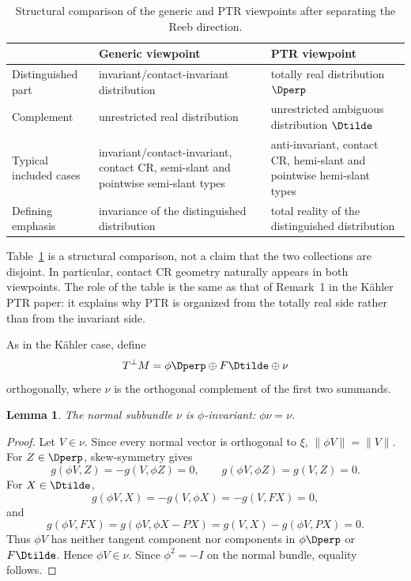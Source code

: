 \documentclass[11pt]{article}
\newtheorem{lemma}[theorem]{Lemma}\newtheorem{corollary}[theorem]{Corollary}
\theoremstyle{definition}\newtheorem{definition}[theorem]{Definition}\newtheorem{example}[theorem]{Example}
\theoremstyle{remark}\newtheorem{remark}[theorem]{Remark}
\newcommand{\Tperp}{T^{\perp}M}
\begin{document}
\begin{table}[ht]
\centering
\small
\caption{Structural comparison of the generic and PTR viewpoints after
separating the Reeb direction.}
\label{tab:generic-ptr}
\begin{tabular}{@{}>{\raggedright\arraybackslash}p{}>{\raggedright\arraybackslash}p{}>{\raggedright\arraybackslash}p{}@{}}
\toprule
 & Generic viewpoint & PTR viewpoint\\
\midrule
Distinguished part
& invariant/contact-invariant distribution
& totally real distribution \(\Dperp\)\\
Complement
& unrestricted real distribution
& unrestricted ambiguous distribution \(\Dtilde\)\\
Typical included cases
& invariant/contact-invariant, contact CR, semi-slant and pointwise semi-slant types
& anti-invariant, contact CR, hemi-slant and pointwise hemi-slant types\\
Defining emphasis
& invariance of the distinguished distribution
& total reality of the distinguished distribution\\
\bottomrule
\end{tabular}
\end{table}

Table~\ref{tab:generic-ptr} is a structural comparison, not a claim that
the two collections are disjoint.  In particular, contact CR geometry
naturally appears in both viewpoints.  The role of the table is the same
as that of Remark~1 in the K\"ahler PTR paper: it explains why PTR is
organized from the totally real side rather than from the invariant side.

As in the K\"ahler case, define
\begin{equation}\label{eq:normal}
 \Tperp=\phi\Dperp\oplus F\Dtilde\oplus\nu
\end{equation}
orthogonally, where $\nu$ is the orthogonal complement of the first two summands.
\begin{lemma}\label{lem:nu}
The normal subbundle $\nu$ is $\phi$-invariant: $\phi\nu=\nu$.
\end{lemma}
\begin{proof}
Let $V\in\nu$. Since every normal vector is orthogonal to $\xi$, $\|\phi V\|=\|V\|$. For $Z\in\Dperp$, skew-symmetry gives
\[
 g(\phi V,Z)=-g(V,\phi Z)=0,
 \qquad g(\phi V,\phi Z)=g(V,Z)=0.
\]
For $X\in\Dtilde$,
\[
 g(\phi V,X)=-g(V,\phi X)=-g(V,FX)=0,
\]
and
\[
 g(\phi V,FX)=g(\phi V,\phi X-PX)=g(V,X)-g(\phi V,PX)=0.
\]
Thus $\phi V$ has neither tangent component nor components in $\phi\Dperp$ or $F\Dtilde$. Hence $\phi V\in\nu$. Since $\phi^2=-I$ on the normal bundle, equality follows.
\end{proof}
\end{document}
